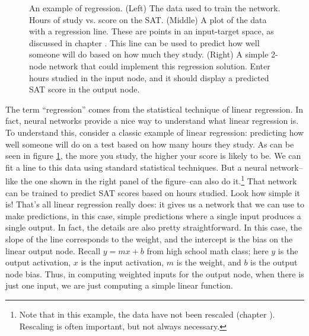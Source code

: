 \begin{figure}[h]
\hspace*{.4in}
\caption[Jeff Yoshimi.]{An example of regression. (Left) The data used to train the network. Hours of study vs. score on the SAT. (Middle) A plot of the data with a regression line. These are points in an input-target space, as discussed in chapter . This line can be used to predict how well someone will do based on how much they study. (Right) A simple 2-node network that could implement this regression solution. Enter hours studied in the input node, and it should display a  predicted SAT score in the output node.}
\label{F:linearRegression}
\end{figure}

The term ``regression'' comes from the statistical technique of linear regression. In fact, neural networks provide a nice way to understand what linear regression is. To understand this, consider a classic example of linear regression: predicting how well someone will do on a test based on how many hours they study. As can be seen in figure \ref{F:linearRegression}, the more you study, the higher your score is likely to be. We can fit a line to this data using standard statistical techniques. But a neural network--like the one shown in the right panel of the figure--can also do it.\footnote{Note that in this example, the data have not been rescaled (chapter ). Rescaling is often important, but not always necessary.} That network can be trained to predict SAT scores based on hours studied. Look how simple it is!  That's all linear regression really does: it gives us a network that we can use to make predictions, in this case, simple predictions where a single input produces a single output. In fact, the details are also pretty straightforward. In this case, the slope of the line corresponds to the weight, and the intercept is the bias on the linear output node. Recall $y=mx + b$ from high school math class; here $y$ is the output activation, $x$ is the input activation, $m$ is the weight, and $b$ is the output node bias. Thus, in computing weighted inputs for the output node, when there is just one input, we are just computing a simple linear function.

